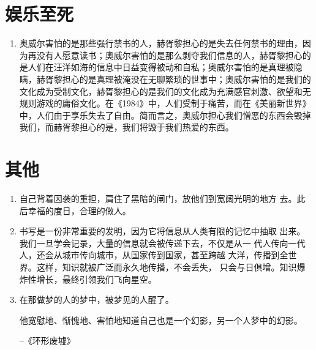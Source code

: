 \documentclass[UTF8]{ctexart}
\begin{document}
	
	\newpage
	
	\section{娱乐至死}
		
		\begin{enumerate}
			\item 奥威尔害怕的是那些强行禁书的人，赫胥黎担心的是失去任何禁书的理由，因为再没有人愿意读书；奥威尔害怕的是那么剥夺我们信息的人，赫胥黎担心的是人们在汪洋如海的信息中日益变得被动和自私；奥威尔害怕的是真理被隐瞒，赫胥黎担心的是真理被淹没在无聊繁琐的世事中；奥威尔害怕的是我们的文化成为受制文化，赫胥黎担心的是我们的文化成为充满感官刺激、欲望和无规则游戏的庸俗文化。在《1984》中，人们受制于痛苦，而在《美丽新世界》中，人们由于享乐失去了自由。简而言之，奥威尔担心我们憎恶的东西会毁掉我们，而赫胥黎担心的是，我们将毁于我们热爱的东西。
		\end{enumerate}
	
	\newpage
	
	\section{其他}
	
		\begin{enumerate}
			
			\item 自己背着因袭的重担，肩住了黑暗的闸门，放他们到宽阔光明的地方
			去。此后幸福的度日，合理的做人。
			
			\item 书写是一份非常重要的发明，因为它将信息从人类有限的记忆中抽取
			出来。我们一旦学会记录，大量的信息就会被传递下去，不仅是从一
			代人传向一代人，还会从城市传向城市，从国家传到国家，甚至跨越
			大洋，传播到全世界。这样，知识就被广泛而永久地传播，不会丢失，
			只会与日俱增。知识爆炸性增长，最终引领我们飞向星空。
			\item 在那做梦的人的梦中，被梦见的人醒了。
			
			他宽慰地、惭愧地、害怕地知道自己也是一个幻影，另一个人梦中的幻影。
			
			\hfill --《环形废墟》
			
		\end{enumerate}
		
		
	
	
	
\end{document}
